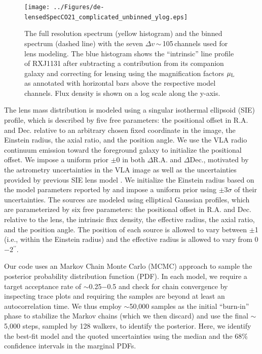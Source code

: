 \documentclass[]{emulateapj}
\begin{document}
\begin{figure}[!htbp]
\centering
\texttt{[image: ../Figures/de-lensedSpecCO21\_complicated\_unbinned\_ylog.eps]}
\caption{The full resolution \bco spectrum (yellow histogram) and 
the binned spectrum (dashed line) with the seven $\Delta v$\,$\sim$\,105\,\kms channels used for lens modeling. The 
blue histogram shows the ``intrinsic'' line profile of RXJ1131 
after subtracting a contribution from its companion galaxy and 
correcting for lensing using the magnification factors $\mu_{\rm L}$ as annotated with horizontal bars
above the respective model channels. Flux density is shown on a log scale along the y-axis.
\label{fig:delensed}}
\end{figure}

The lens mass distribution is modeled using a singular isothermal
ellipsoid (SIE) profile, which is described by five free parameters: the
positional offset in R.A. and Dec. relative to an arbitrary chosen
fixed coordinate in the image, the Einstein radius, the axial ratio, and the
position angle. We use the VLA radio continuum emission toward
the foreground galaxy to initialize the positional offset. We impose a
uniform prior $\pm$0 in both $\Delta$R.A. and $\Delta$Dec.,
motivated by the astrometry uncertainties in the VLA image as well as
the uncertainties provided by previous SIE lens model .
We initialize the Einstein radius based on the model parameters reported by 
and impose a uniform prior using $\pm$3$\sigma$ of their uncertainties.
The sources are modeled using elliptical Gaussian profiles, which are
parameterized by six free parameters: the positional offset in R.A.
and Dec. relative to the lens, the intrinsic flux density, the effective
radius, the axial ratio, and the position angle. The position of each source
is allowed to vary between $\pm$1 (i.e., within the Einstein radius)
and the effective radius is allowed to vary from 0$-$2$^{\prime\prime}$.

Our code uses an Markov Chain Monte Carlo (MCMC) approach to sample the
posterior probability distribution function (PDF).
In each model, we require a target acceptance rate of $\sim$0.25$-$0.5
and check for chain convergence by inspecting trace plots
and requiring the samples are beyond at least an autocorrelation time.
We thus employ $\sim$50,000 samples as the initial ``burn-in'' phase
to stabilize the Markov chains (which we then discard) and
use the final $\sim$5,000 steps, sampled by 128 walkers, to identify
the posterior. Here, we
identify the best-fit model and the quoted uncertainties using the
median and the 68\% confidence intervals in the marginal PDFs.

\end{document}

